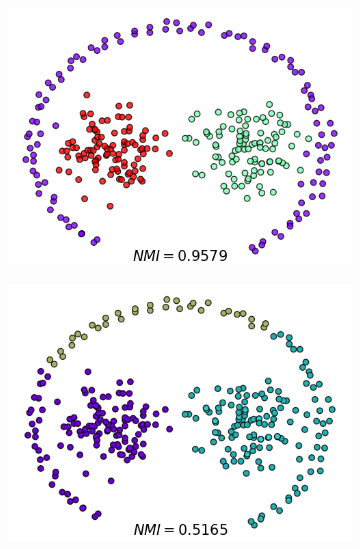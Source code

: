 \documentclass{llncs}
\begin{document}
\begin{figure}[ht]
\vspace*{-.4cm}
\centering
\begin{subfigure}[t]{0.23\textwidth}
\centering
\includegraphics[width=1\textwidth]{image/pathbased_MDPC.png}
\end{subfigure}
\begin{subfigure}[t]{0.23\textwidth}
\centering
\includegraphics[width=1\textwidth]{image/pathbased_org.png}
\end{subfigure}
\begin{subfigure}[t]{0.23\textwidth}
\centering

\end{subfigure}
\end{figure}
\end{document}
